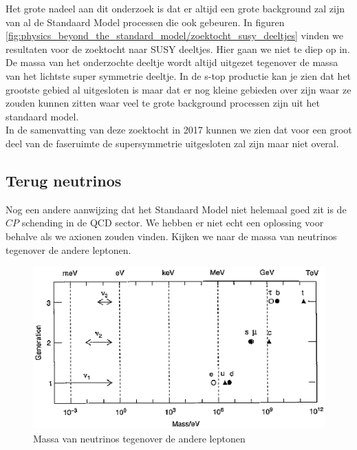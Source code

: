 \documentclass[../main.tex]{subfiles}
\begin{document}
Het grote nadeel aan dit onderzoek is dat er altijd een grote background zal zijn van al de Standaard Model processen die ook gebeuren. In figuren \ref{fig:physics_beyond_the_standard_model/zoektocht_susy_deeltjes} vinden we resultaten voor de zoektocht naar SUSY deeltjes. Hier gaan we niet te diep op in. De massa van het onderzochte deeltje wordt altijd uitgezet tegenover de massa van het lichtste super symmetrie deeltje. In de s-top productie kan je zien dat het grootste gebied al uitgesloten is maar dat er nog kleine gebieden over zijn waar ze zouden kunnen zitten waar veel te grote background processen zijn uit het standaard model.\\
In de samenvatting van deze zoektocht in 2017 kunnen we zien dat voor een groot deel van de faseruimte de supersymmetrie uitgesloten zal zijn maar niet overal.

\subsection{Terug neutrinos}%
\label{sub:terug_neutrinos}

Nog een andere aanwijzing dat het Standaard Model niet helemaal goed zit is de $CP$ schending in de QCD sector. We hebben er niet echt een oplossing voor behalve als we axionen zouden vinden. Kijken we naar de massa van neutrinos tegenover de andere leptonen.

\begin{figure}[h]
    \centering
    \includegraphics[width=0.5\linewidth]{physics_beyond_the_standard_model/neutrino_massa.png}
    \caption{Massa van neutrinos tegenover de andere leptonen}%
    \label{fig:physics_beyond_the_standard_model/neutrino_massa}
\end{figure}
\end{document}
